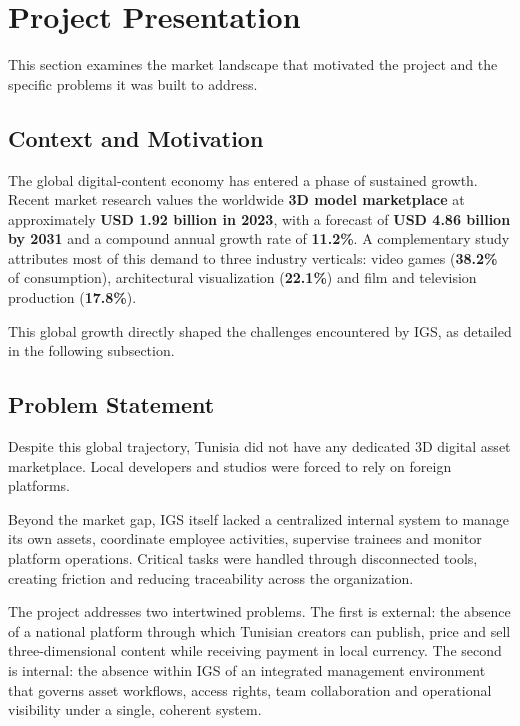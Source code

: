 \section{Project Presentation}

This section examines the market landscape that motivated the project and the specific problems it was built to address.

\subsection{Context and Motivation}

The global digital-content economy has entered a phase of sustained growth. Recent market
research \cite{citius2024} values the worldwide \textbf{3D model marketplace} at
approximately \textbf{USD 1.92 billion in 2023}, with a forecast of \textbf{USD 4.86 billion
by 2031} and a compound annual growth rate of \textbf{11.2\%}. A complementary study
\cite{pmarket2024} attributes most of this demand to three industry verticals: video
games (\textbf{38.2\%} of consumption), architectural visualization (\textbf{22.1\%}) and
film and television production (\textbf{17.8\%}).



This global growth directly shaped the challenges encountered by IGS, as detailed in the following subsection.

\subsection{Problem Statement}
Despite this global trajectory, Tunisia did not have any dedicated 3D digital asset
marketplace. Local developers and studios were forced to rely on
foreign platforms. 

Beyond the market gap, IGS itself lacked a centralized internal system to manage
its own assets, coordinate employee activities, supervise trainees and monitor platform
operations. Critical tasks were handled through disconnected tools, creating friction
and reducing traceability across the organization.

The project addresses two intertwined problems. The first is external: the absence of a
national platform through which Tunisian creators can publish, price and sell
three-dimensional content while receiving payment in local currency. The second is
internal: the absence within IGS of an integrated management environment that governs
asset workflows, access rights, team collaboration and operational visibility under
a single, coherent system.






